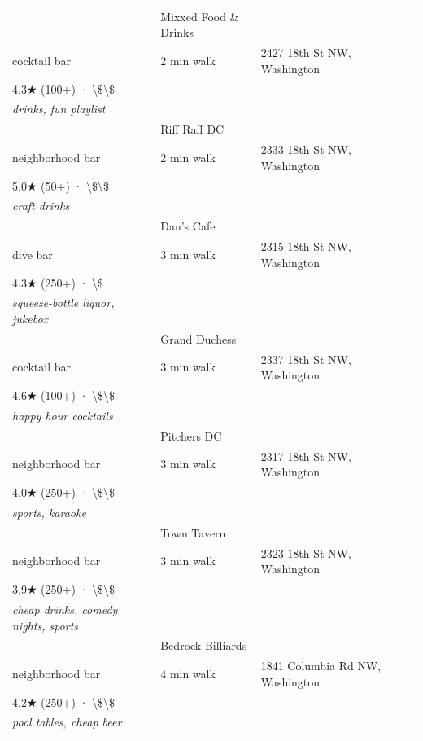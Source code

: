 \documentclass[11pt,a4paper]{article}
\begin{document}
{\begin{longtable}{@{}p{0.5cm}p{6.5cm}p{2.5cm}p{6.5cm}@{}}
\addlinespace[2pt]
6 & Mixxed Food \& Drinks \\ \textcolor{brandmuted}{\footnotesize cocktail bar} & 2 min walk & \textcolor{brandmuted}{\footnotesize 2427 18th St NW,  Washington} \\ 4.3★ (100+) · \textbackslash{}\$\textbackslash{}\$ \\ \textit{drinks, fun playlist} \\
\addlinespace[2pt]
7 & Riff Raff DC \\ \textcolor{brandmuted}{\footnotesize neighborhood bar} & 2 min walk & \textcolor{brandmuted}{\footnotesize 2333 18th St NW,  Washington} \\ 5.0★ (50+) · \textbackslash{}\$\textbackslash{}\$ \\ \textit{craft drinks} \\
\addlinespace[2pt]
8 & Dan's Cafe \\ \textcolor{brandmuted}{\footnotesize dive bar} & 3 min walk & \textcolor{brandmuted}{\footnotesize 2315 18th St NW,  Washington} \\ 4.3★ (250+) · \textbackslash{}\$ \\ \textit{squeeze-bottle liquor, jukebox} \\
\addlinespace[2pt]
9 & Grand Duchess \\ \textcolor{brandmuted}{\footnotesize cocktail bar} & 3 min walk & \textcolor{brandmuted}{\footnotesize 2337 18th St NW,  Washington} \\ 4.6★ (100+) · \textbackslash{}\$\textbackslash{}\$ \\ \textit{happy hour cocktails} \\
\addlinespace[2pt]
10 & Pitchers DC \\ \textcolor{brandmuted}{\footnotesize neighborhood bar} & 3 min walk & \textcolor{brandmuted}{\footnotesize 2317 18th St NW,  Washington} \\ 4.0★ (250+) · \textbackslash{}\$\textbackslash{}\$ \\ \textit{sports, karaoke} \\
\addlinespace[2pt]
11 & Town Tavern \\ \textcolor{brandmuted}{\footnotesize neighborhood bar} & 3 min walk & \textcolor{brandmuted}{\footnotesize 2323 18th St NW,  Washington} \\ 3.9★ (250+) · \textbackslash{}\$\textbackslash{}\$ \\ \textit{cheap drinks, comedy nights, sports} \\
\addlinespace[2pt]
12 & Bedrock Billiards \\ \textcolor{brandmuted}{\footnotesize neighborhood bar} & 4 min walk & \textcolor{brandmuted}{\footnotesize 1841 Columbia Rd NW,  Washington} \\ 4.2★ (250+) · \textbackslash{}\$\textbackslash{}\$ \\ \textit{pool tables, cheap beer} \\

\end{longtable}}
\end{document}
